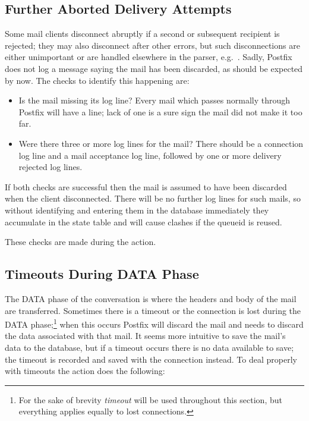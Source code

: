 \subsection{Further Aborted Delivery Attempts}

Some mail clients disconnect abruptly if a second or subsequent recipient
is rejected; they may also disconnect after other errors, but such
disconnections are either unimportant or are handled elsewhere in the
parser, e.g.\ .  Sadly, Postfix does
not log a message saying the mail has been discarded, as should be expected
by now.  The checks to identify this happening are:

\begin{itemize}

    \item Is the mail missing its  log line?  Every mail
        which passes normally through Postfix will have a 
        line; lack of one is a sure sign the mail did not make it too far.

    \item Were there three or more  log lines for the mail?
        There should be a connection log line and a mail acceptance log
        line, followed by one or more delivery rejected log lines.

\end{itemize}

If both checks are successful then the mail is assumed to have been
discarded when the client disconnected.  There will be no further log lines
for such mails, so without identifying and entering them in the database
immediately they accumulate in the state table and will cause clashes if
the queueid is reused.

These checks are made during the  action.

\subsection{Timeouts During DATA Phase}

\label{timeouts during data phase}

The DATA phase of the  conversation is where the headers and
body of the mail are transferred.  Sometimes there is a timeout or the
connection is lost during the DATA phase;\footnote{For the sake of brevity
\textit{timeout\/} will be used throughout this section, but everything
applies equally to lost connections.} when this occurs Postfix will discard
the mail and \parsername{} needs to discard the data associated with that
mail.  It seems more intuitive to save the mail's data to the database, but
if a timeout occurs there is no data available to save; the timeout is
recorded and saved with the connection instead.  To deal properly with
timeouts the  action does the following:

